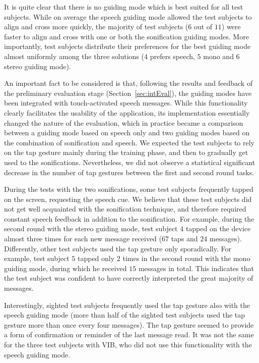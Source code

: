 \documentclass{article}
\begin{document}
It is quite clear that there is no guiding mode which is best suited for all test subjects.
While on average the speech guiding mode allowed the test subjects to align and cross more quickly,
the majority of test subjects ($6$ out of $11$) were faster to align and cross with one or both the sonification guiding modes.
More importantly, test subjects distribute their preferences for the best guiding mode almost uniformly among the three solutions ($4$ prefers speech, $5$ mono and $6$ stereo guiding mode).

An important fact to be considered is that, following the results and feedback of the preliminary evaluation stage (Section~\ref{sec:intEval}), the guiding modes have been integrated with touch-activated speech messages.
While this functionality clearly facilitates the usability of the application, its implementation essentially changed the nature of the evaluation, which in practice became a comparison between a guiding mode based on speech only and two guiding modes based on the combination of sonification and speech.
We expected the test subjects to rely on the tap gesture mainly during the training phase, and then to gradually get used to the sonifications. Nevertheless, we did not observe a statistical significant decrease in the number of tap gestures between the first and second round tasks.

During the tests with the two sonifications, some test subjects frequently tapped on the screen, requesting the speech cue.
We believe that these test subjects did not get well acquainted with the sonification technique, and therefore required constant speech feedback in addition to the sonification.
For example, during the second round with the stereo guiding mode, test subject $4$ tapped on the device almost three times for each new message received ($67$ taps and $24$ messages).
Differently, other test subjects used the tap gesture only sporadically. For example, test subject $5$ tapped only $2$ times in the second round with the mono guiding mode, during which he received $15$ messages in total. This indicates that the test subject was confident to have correctly interpreted the great majority of messages.

Interestingly, sighted test subjects frequently used the tap gesture also with the speech guiding mode (more than half of the sighted test subjects used the tap gesture more than once every four messages).
The tap gesture seemed to provide a form of confirmation or reminder of the last message read. It was not the same for the three test subjects with VIB, who did not use this functionality with the speech guiding mode.
\end{document}
